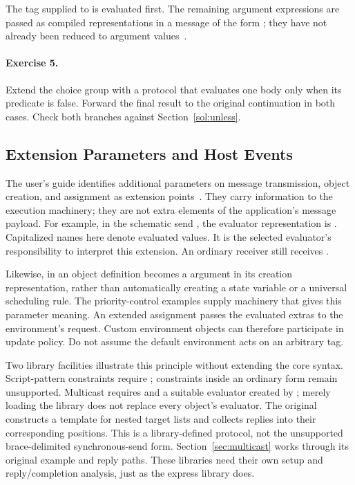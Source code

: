 The tag supplied to  is evaluated first. The remaining
argument expressions are passed as compiled representations in a message
of the form ; they have
not already been reduced to argument values~\cite{guide}.

\paragraph{Exercise 5.}
Extend the choice group with a  protocol that evaluates
one body only when its predicate is false. Forward the final result
to the original continuation in both cases.
Check both branches against Section~\ref{sol:unless}.

\subsection{Extension Parameters and Host Events}

The user's guide identifies additional parameters on message transmission,
object creation, and assignment as extension points~\cite{guide}.
They carry information to the execution machinery; they are not extra
elements of the application's message payload. For example, in the
schematic send \code{[target <= payload @ reply :RVT stamp]}, the
evaluator representation is
.
Capitalized names here denote evaluated values.
It is the selected evaluator's responsibility to interpret this extension.
An ordinary receiver still receives .

Likewise,  in an object definition becomes a
 argument in its creation representation, rather than
automatically creating a state variable or a universal scheduling rule.
The priority-control examples supply machinery that gives this parameter
meaning. An extended assignment \code{[x := value tag argument]}
passes the evaluated extras to the environment's  request.
Custom environment objects can therefore participate in update policy.
Do not assume the default environment acts on an arbitrary tag.

Two library facilities illustrate this principle without extending the
core syntax. Script-pattern  constraints require
; constraints inside an ordinary  form
remain unsupported. Multicast requires  and a suitable
evaluator created by ; merely loading the
library does not replace every object's evaluator.
The original  constructs a template for
nested target lists and collects replies into their corresponding
positions. This is a library-defined protocol, not the unsupported
brace-delimited synchronous-send form.
Section~\ref{sec:multicast} works through its original example and reply paths.
These libraries need their own setup and reply/completion analysis,
just as the express library does.

